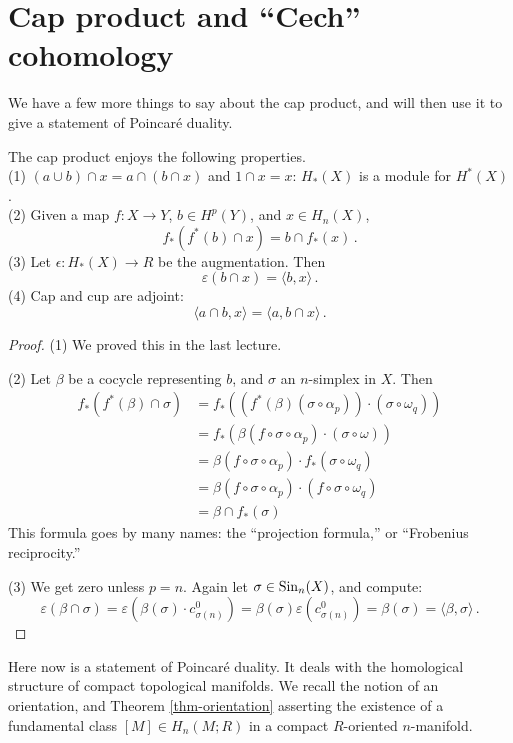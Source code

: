 \section{Cap product and ``Cech'' cohomology}

We have a few more things to say about the cap product, and will then use it
to give a statement of Poincar\'e duality. 

\begin{prop}
The cap product enjoys the following properties.\\
(1) $(a\cup b)\cap x=a\cap(b\cap x)$ and $1\cap x=x$: $H_*(X)$ is a module for
$H^*(X)$.\\
(2) Given a map $f:X\to Y$, $b\in H^p(Y)$, and $x\in H_n(X)$, 
\[
f_*(f^*(b)\cap x)=b\cap f_*(x)\,.
\]
(3) Let $\epsilon:H_*(X)\to R$ be the augmentation. Then 
\[
\varepsilon(b\cap x)=\langle b,x\rangle\,.
\]
(4) Cap and cup are adjoint:
\[
\langle a\cap b,x\rangle=\langle a,b\cap x\rangle\,.
\]
\end{prop}
\begin{proof}
(1) We proved this in the last lecture.

\noindent
(2) Let $\beta$ be a cocycle representing $b$, and $\sigma$ an $n$-simplex
in $X$. Then
\begin{align*}
f_\ast(f^\ast(\beta)\cap\sigma)& =f_\ast(\left(f^\ast(\beta)(\sigma\circ\alpha_p)\right)\cdot(\sigma\circ\omega_q))\\
& =f_\ast(\beta(f\circ\sigma\circ\alpha_p)\cdot(\sigma\circ\omega))\\
& =\beta(f\circ\sigma\circ\alpha_p)\cdot f_\ast(\sigma\circ\omega_q)\\
& = \beta(f\circ\sigma\circ\alpha_p)\cdot(f\circ\sigma\circ\omega_q)\\
& = \beta\cap f_\ast(\sigma)
\end{align*}
This formula goes by many names: the ``projection formula,'' or ``Frobenius
reciprocity.'' 

\noindent
(3) We get zero unless $p=n$. Again let $\sigma\in\mathrm{Sin}_n(X)$, and compute:
\[
\varepsilon(\beta\cap\sigma)=\varepsilon(\beta(\sigma)\cdot c^0_{\sigma(n)})=\beta(\sigma)\varepsilon(c^0_{\sigma(n)})=\beta(\sigma)=\langle \beta,\sigma\rangle
\,.
\]
\end{proof}

Here now is a statement of Poincar\'e duality. It deals with the 
homological structure of compact topological manifolds. We recall the
notion of an orientation, and Theorem \ref{thm-orientation} asserting
the existence of a fundamental class $[M]\in H_n(M;R)$ in a compact
$R$-oriented $n$-manifold.


